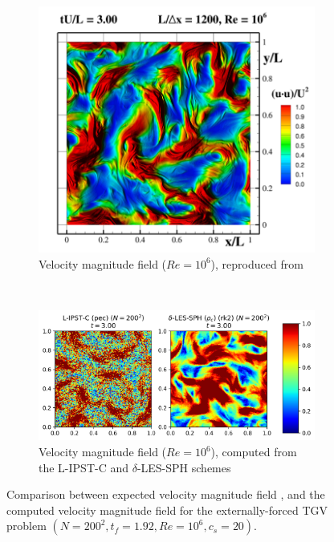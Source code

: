 \begin{figure}[htbp!]
\centering
\begin{subfigure}{10cm}
\centering\includegraphics[width=10cm]{Code-Figures/ext-force-tgv/colag_vmag_t_3.png}
\caption{Velocity magnitude field ($Re = 10^6$), reproduced from \cite{Antuono_Marrone_Di_Mascio_Colagrossi_2021}}
\end{subfigure}
\\ \vspace{1cm}
\begin{subfigure}{14cm}
\centering\includegraphics[width=14cm]{Code-Figures/ext-force-tgv/vmag_t_3.png}
\caption{Velocity magnitude field ($Re = 10^6$), computed from the L-IPST-C and $\delta$-LES-SPH schemes}
\end{subfigure}
\caption{Comparison between expected velocity magnitude field \parencite{Antuono_Marrone_Di_Mascio_Colagrossi_2021}, and the computed velocity magnitude field for the externally-forced TGV problem $(N=200^2, t_f=1.92, Re=10^6, c_s=20)$.}
\label{fig:tgv-forced-colag-vmag}
\end{figure}


